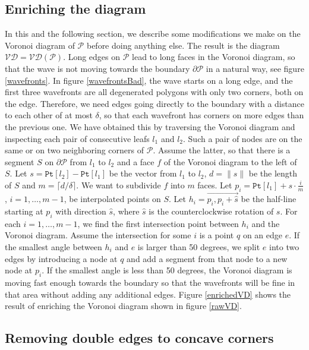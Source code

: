 \documentclass[3p]{elsarticle}
\newcommand{\VD}{\mathcal{VD}}
\newcommand{\PP}{\mathcal{P}}
\newcommand{\stepover}{\delta}
\newcommand{\point}{\texttt{Pt}}
\newcommand{\ora}[1]{\overrightarrow{#1}}
\begin{document}
\subsection{Enriching the diagram}\label{enriching}

In this and the following section, we describe some modifications we make on the Voronoi
diagram of $\PP$ before doing anything else. The result is the diagram $\VD=\VD(\PP)$.
Long edges on $\PP$ lead to long
faces in the Voronoi diagram,
so that the wave is not moving towards the boundary $\partial\PP$
in a natural way, see figure \ref{wavefronts}.
In figure \ref{wavefrontsBad}, the wave starts on a long edge, and the first three
wavefronts are all degenerated polygons with only two corners, both on the edge.
Therefore, we need edges going directly to the boundary with a distance to each other
of at most $\stepover$,
so that each wavefront has corners on more edges than the previous one.
We have obtained this by traversing the Voronoi diagram and inspecting each pair of
consecutive leafs $l_1$ and $l_2$. Such a pair of nodes are
on the same or on two neighboring corners of $\PP$. Assume the latter, so that
there is a segment $S$ on $\partial\PP$ from $l_1$ to $l_2$ and a face $f$ of the Voronoi diagram
to the left of $S$.
Let $s=\point[l_2] - \point[l_1]$ be the vector from $l_1$ to $l_2$,
$d=\lVert s\rVert$ be the length of $S$ and
$m=\lceil d/\stepover\rceil$. We want to subdivide $f$ into $m$ faces.
Let
$p_i=\point[l_1] + s\cdot \frac i m$, $i=1,\ldots,m-1$, be interpolated points on $S$.
Let $h_i=\ora{p_i,p_i+\widehat s}$ be the half-line starting at $p_i$ with direction $\widehat s$,
where $\widehat s$ is the counterclockwise rotation of $s$.
For each $i=1,\ldots,m-1$, we find the first intersection point between $h_i$ and the Voronoi
diagram. Assume the intersection for some $i$ is a point $q$ on an edge $e$.
If the smallest angle between
$h_i$ and $e$ is larger than 50 degrees, we split $e$ into two edges by introducing a node at $q$
and add a segment from that node to a new node at $p_i$. If the smallest angle is less than 50 degrees,
the Voronoi diagram is moving fast enough towards the boundary so that the wavefronts will be fine
in that area without adding any additional edges.
Figure \ref{enrichedVD} shows the result of enriching the Voronoi diagram shown in
figure \ref{rawVD}.

\subsection{Removing double edges to concave corners}\label{removing}
\end{document}
